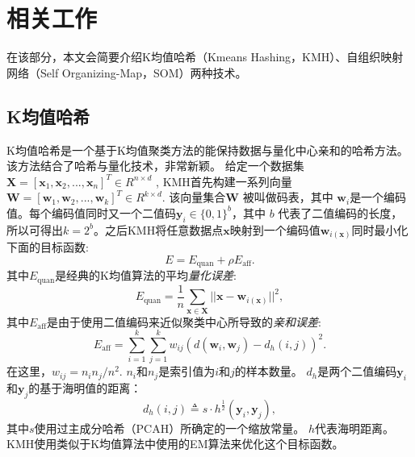 \section{相关工作}
在该部分，本文会简要介绍K均值哈希（Kmeans Hashing，KMH）、自组织映射网络（Self Organizing-Map，SOM）两种技术。

\subsection{K均值哈希}
K均值哈希是一个基于K均值聚类方法的能保持数据与量化中心亲和的哈希方法。该方法结合了哈希与量化技术，非常新颖。
给定一个数据集 $\mathbf{X} = [\mathbf{x}_{1}, \mathbf{x}_{2},...,\mathbf{x}_{n}]^{T} \in R^{n\times d}$ ,
KMH首先构建一系列向量 $\mathbf{W} = [\mathbf{w}_{1},  \mathbf{w}_{2}, ..., \mathbf{w}_{k}]^{T} \in R^{k\times d}$.
该向量集合$\mathbf{W}$ 被叫做码表，其中 $\mathbf{w}_{i}$是一个编码值。每个编码值同时又一个二值码$\mathbf{y}_{i}\in \{0, 1\}^{b}$，其中 $b$ 代表了二值编码的长度，所以可得出$k=2^{b}$。之后KMH将任意数据点$\mathbf{x}$映射到一个编码值$\mathbf{w}_{i(\mathbf{x})}$同时最小化下面的目标函数:
\begin{equation}\label{eq:4}
E = E_{\mathrm{quan}} + \rho E_{\mathrm{aff}}.
\end{equation}
其中$E_{\mathrm{quan}}$是经典的K均值算法的平均\emph{量化误差}:
\begin{equation}\label{eq:1}
E_{\mathrm{quan}} = \frac{1}{n}\sum_{\mathbf{x}\in \mathbf{X}} ||\mathbf{x}-\mathbf{w}_{i(\mathbf{x})}||^{2},
\end{equation}
其中$E_{\mathrm{aff}}$是由于使用二值编码来近似聚类中心所导致的\emph{亲和误差}:
\begin{equation}
E_{\mathrm{aff}}= \sum_{i=1}^{k}\sum_{j=1}^{k}w_{ij}(d(\mathbf{w}_{i}, \mathbf{w}_{j}) - d_{h}(i, j))^2.
\end{equation}
在这里，$w_{ij} = n_{i}n_{j}/n^{2}$. $n_{i}$和$n_{j}$是索引值为$i$和$j$的样本数量。 $d_{h}$是两个二值编码$\mathbf{y}_{i}$和$\mathbf{y}_{j}$的基于海明值的距离：
\begin{equation}\label{eq:d_h}
d_{h}(i,j) \triangleq s \cdot h^{\frac{1}{2}}(\mathbf{y}_{i},\mathbf{y}_{j}),
\end{equation}
其中$s$使用过主成分哈希（PCAH）所确定的一个缩放常量。 $h$代表海明距离。
KMH使用类似于K均值算法中使用的EM算法来优化这个目标函数。

